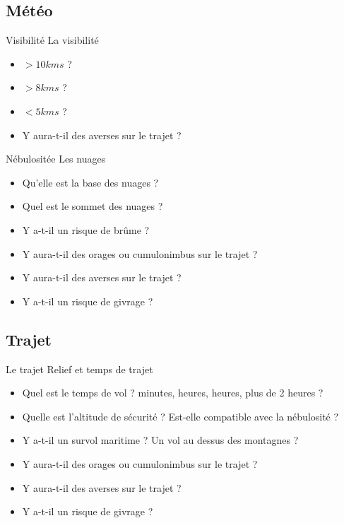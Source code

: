 \documentclass{beamer}
\begin{document}
\subsection{Météo}
\begin{frame}{Visibilité}
  La visibilité

  \begin{itemize}
    \item $> 10 kms$ ? \pause
    \item $> 8 kms$ ? \pause
    \item $< 5 kms$ ? \pause
    \item Y aura-t-il des averses sur le trajet ?
  \end{itemize}
\end{frame}

\begin{frame}{Nébulositée}
  Les nuages

  \begin{itemize}
    \item Qu'elle est la base des nuages ? \pause
    \item Quel est le sommet des nuages ? \pause
    \item Y a-t-il un risque de brûme ? \pause
    \item Y aura-t-il des orages ou cumulonimbus sur le trajet ? \pause
    \item Y aura-t-il des averses sur le trajet ? \pause
    \item Y a-t-il un risque de givrage ?
  \end{itemize}
\end{frame}

\subsection{Trajet}
\begin{frame}{Le trajet}
  Relief et temps de trajet

  \begin{itemize}
    \item Quel est le temps de vol ?  minutes,  heures,  heures, \pause plus de 2 heures ? \pause
    \item Quelle est l'altitude de sécurité ? \pause Est-elle compatible avec la nébulosité ? \pause
    \item Y a-t-il un survol maritime ? \pause Un vol au dessus des montagnes ? \pause
    \item Y aura-t-il des orages ou cumulonimbus sur le trajet ? \pause
    \item Y aura-t-il des averses sur le trajet ? \pause
    \item Y a-t-il un risque de givrage ? \pause
  \end{itemize}
\end{frame}
\end{document}

